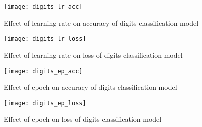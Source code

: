 \documentclass[12pt, a4paper, twoside]{article}
\begin{document}
\begin{figure}[p]
	\centering
	\texttt{[image: digits\_lr\_acc]}
	\caption{Effect of learning rate on accuracy of digits classification model}
	\label{F:digits_lr_acc}
\end{figure}
\begin{figure}[p]
	\centering
	\texttt{[image: digits\_lr\_loss]}
	\caption{Effect of learning rate on loss of digits classification model}
	\label{F:digits_lr_loss}
\end{figure}
\begin{figure}[p]
	\centering
	\texttt{[image: digits\_ep\_acc]}
	\caption{Effect of epoch on accuracy of digits classification model}
	\label{F:digits_ep_acc}
\end{figure}
\begin{figure}[p]
	\centering
	\texttt{[image: digits\_ep\_loss]}
	\caption{Effect of epoch on loss of digits classification model}
	\label{F:digits_ep_loss}
\end{figure}
\printbibliography
\end{document}
